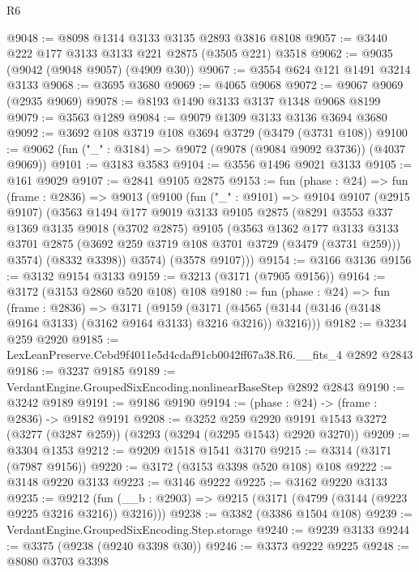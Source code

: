 \begin{lexlean}{R6}
\begin{coremodule}
@9048 := @8098 @1314 @3133 @3135 @2893 @3816 @8108
@9057 := @3440 @222 @177 @3133 @3133 @221 @2875 (@3505 @221) @3518
@9062 := @9035 (@9042 (@9048 @9057) (@4909 @30))
@9067 := @3554 @624 @121 @1491 @3214 @3133
@9068 := @3695 @3680
@9069 := @4065 @9068
@9072 := @9067 @9069 (@2935 @9069)
@9078 := @8193 @1490 @3133 @3137 @1348 @9068 @8199
@9079 := @3563 @1289
@9084 := @9079 @1309 @3133 @3136 @3694 @3680
@9092 := @3692 @108 @3719 @108 @3694 @3729 (@3479 (@3731 @108))
@9100 := @9062 (fun ("_" : @3184) => @9072 (@9078 (@9084 @9092 @3736)) (@4037 @9069))
@9101 := @3183 @3583
@9104 := @3556 @1496 @9021 @3133
@9105 := @161 @9029
@9107 := @2841 @9105 @2875
@9153 := fun (phase : @24) =>
  fun (frame : @2836) =>
  @9013
    (@9100
      (fun ("_" : @9101) =>
      @9104
        @9107
        (@2915 @9107)
        (@3563
          @1494
          @177
          @9019
          @3133
          @9105
          @2875
          (@8291
            @3553
            @337
            @1369
            @3135
            @9018
            (@3702 @2875)
            @9105
            (@3563
              @1362
              @177
              @3133
              @3133
              @3701
              @2875
              (@3692 @259 @3719 @108 @3701 @3729 (@3479 (@3731 @259)))
              @3574)
            (@8332 @3398))
          @3574)
        (@3578 @9107)))
@9154 := @3166 @3136
@9156 := @3132 @9154 @3133
@9159 := @3213 (@3171 (@7905 @9156))
@9164 := @3172 (@3153 @2860 @520 @108) @108
@9180 := fun (phase : @24) =>
  fun (frame : @2836) =>
  @3171
    (@9159
      (@3171 (@4565 (@3144 (@3146 (@3148 @9164 @3133) (@3162 @9164 @3133) @3216 @3216)) @3216)))
@9182 := @3234 @259 @2920
@9185 := LexLeanPreserve.Cebd9f4011e5d4cdaf91cb0042ff67a38.R6.__fits_4 @2892 @2843
@9186 := @3237 @9185
@9189 := VerdantEngine.GroupedSixEncoding.nonlinearBaseStep @2892 @2843
@9190 := @3242 @9189
@9191 := @9186 @9190
@9194 := (phase : @24) -> (frame : @2836) -> @9182 @9191
@9208 := @3252
    @259
    @2920
    @9191
    @1543
    @3272
    (@3277 (@3287 @259))
    (@3293 (@3294 (@3295 @1543) @2920 @3270))
@9209 := @3304 @1353
@9212 := @9209 @1518 @1541 @3170
@9215 := @3314 (@3171 (@7987 @9156))
@9220 := @3172 (@3153 @3398 @520 @108) @108
@9222 := @3148 @9220 @3133
@9223 := @3146 @9222
@9225 := @3162 @9220 @3133
@9235 := @9212 (fun (__b : @2903) => @9215 (@3171 (@4799 (@3144 (@9223 @9225 @3216 @3216)) @3216)))
@9238 := @3382 (@3386 @1504 @108)
@9239 := VerdantEngine.GroupedSixEncoding.Step.storage
@9240 := @9239 @3133
@9244 := @3375 (@9238 (@9240 @3398 @30))
@9246 := @3373 @9222 @9225
@9248 := @8080 @3703 @3398

\end{coremodule}
\end{lexlean}
